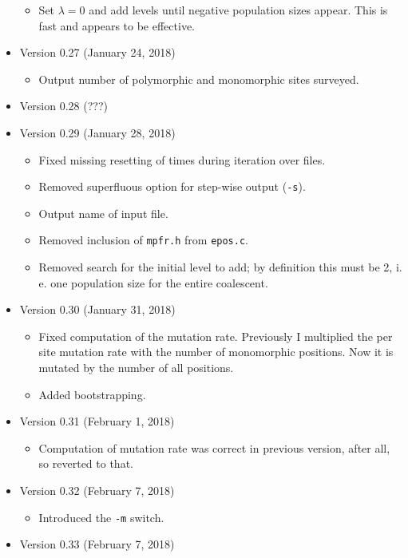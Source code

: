 \documentclass[a4paper]{article}
\newcommand{\ty}{\texttt}
\begin{document}
\begin{itemize}
\begin{itemize}
  \item Set $\lambda=0$ and add levels until negative population sizes
    appear. This is fast and appears to be effective.
  \end{itemize}
\item Version 0.27 (January 24, 2018)
  \begin{itemize}
  \item Output number of polymorphic and monomorphic sites surveyed.
  \end{itemize}
\item Version 0.28 (???)
\item Version 0.29 (January 28, 2018)
  \begin{itemize}
  \item Fixed missing resetting of times during iteration over files.
  \item Removed superfluous option for step-wise output (\ty{-s}).
  \item Output name of input file.
  \item Removed inclusion of \ty{mpfr.h} from \ty{epos.c}.
  \item Removed search for the initial level to add; by definition
    this must be 2, i. e. one population size for the entire coalescent.
  \end{itemize}
\item Version 0.30 (January 31, 2018)
  \begin{itemize}
  \item Fixed computation of the mutation rate. Previously I
    multiplied the per site mutation rate with the number of
    monomorphic positions. Now it is mutated by the number of all
    positions.
  \item Added bootstrapping.
  \end{itemize}
\item Version 0.31 (February 1, 2018)
  \begin{itemize}
    \item Computation of mutation rate was correct in previous
      version, after all, so reverted to that.
  \end{itemize}
\item Version 0.32 (February 7, 2018)
  \begin{itemize}
    \item Introduced the \ty{-m} switch.
  \end{itemize}
\item Version 0.33 (February 7, 2018)
  \begin{itemize}

\end{itemize}
\end{itemize}
\end{document}

